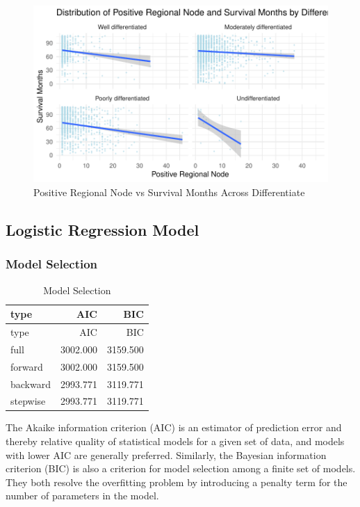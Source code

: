 \documentclass[
]{article}
\begin{document}
\begin{figure}
\includegraphics[width=0.9\linewidth]{Appendix_files/figure-latex/positive_regional_node_vs_survival_months_across_differentiate-1} \caption{Positive Regional Node vs Survival Months Across Differentiate}\label{fig:positive_regional_node_vs_survival_months_across_differentiate}
\end{figure}

\newpage

\subsection{Logistic Regression Model}\label{logistic-regression-model}

\subsubsection{Model Selection}\label{model-selection}

\begin{longtable}[]{@{}lrr@{}}
\caption{Model Selection}\tabularnewline
\toprule\noalign{}
type & AIC & BIC \\
\midrule\noalign{}
\endfirsthead
\toprule\noalign{}
type & AIC & BIC \\
\midrule\noalign{}
\endhead
\bottomrule\noalign{}
\endlastfoot
full & 3002.000 & 3159.500 \\
forward & 3002.000 & 3159.500 \\
backward & 2993.771 & 3119.771 \\
stepwise & 2993.771 & 3119.771 \\
\end{longtable}

The Akaike information criterion (AIC) is an estimator of prediction
error and thereby relative quality of statistical models for a given set
of data, and models with lower AIC are generally preferred. Similarly,
the Bayesian information criterion (BIC) is also a criterion for model
selection among a finite set of models. They both resolve the
overfitting problem by introducing a penalty term for the number of
parameters in the model.
\end{document}
